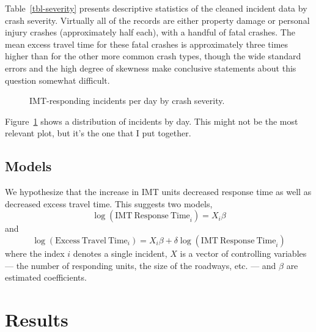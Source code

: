 \documentclass[
  letterpaper,
  authoryear]{elsarticle}
\begin{document}
Table~\ref{tbl-severity} presents descriptive statistics of the cleaned
incident data by crash severity. Virtually all of the records are either
property damage or personal injury crashes (approximately half each),
with a handful of fatal crashes. The mean excess travel time for these
fatal crashes is approximately three times higher than for the other
more common crash types, though the wide standard errors and the high
degree of skewness make conclusive statements about this question
somewhat difficult.

\begin{figure}


\caption{\label{fig-frequency}IMT-responding incidents per day by crash
severity.}

\end{figure}%

Figure~\ref{fig-frequency} shows a distribution of incidents by day.
This might not be the most relevant plot, but it's the one that I put
together.

\subsection{Models}\label{models}

We hypothesize that the increase in IMT units decreased response time as
well as decreased excess travel time. This suggests two models, \[ 
\log(\mathrm{IMT\ Response\ Time}_i) = X_i\beta
\] and \[ 
\log(\mathrm{Excess\ Travel\ Time}_i) = X_i\beta + \delta\log(\mathrm{IMT\ Response\ Time}_i)
\] where the index \(i\) denotes a single incident, \(X\) is a vector of
controlling variables --- the number of responding units, the size of
the roadways, etc. --- and \(\beta\) are estimated coefficients.


\section{Results}\label{results}
\end{document}
